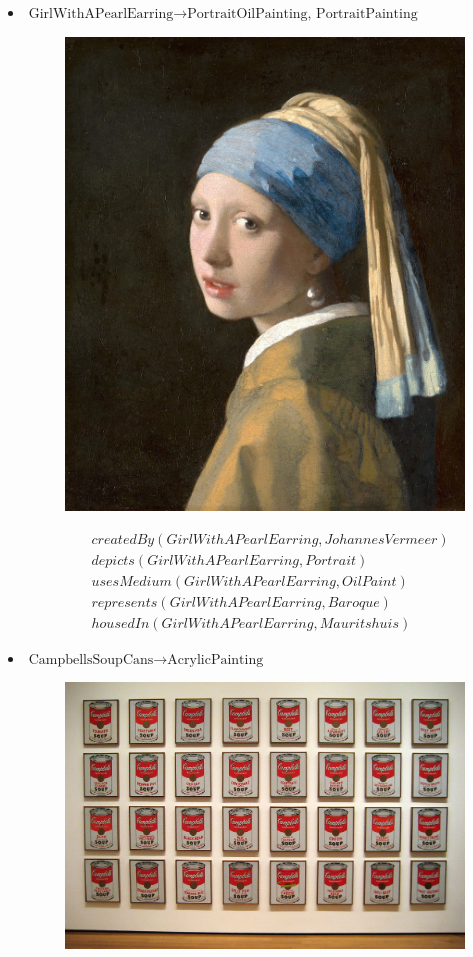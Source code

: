 \documentclass[a4paper, 11pt]{article}
\begin{document}
\begin{itemize}
  \item $\text{GirlWithAPearlEarring} \to \text{PortraitOilPainting, PortraitPainting}$
    \begin{figure}[H]
      \centering
      \includegraphics[width=0.35\linewidth]{images/girlwithpearlearring.jpg}
    \end{figure}
    \begin{align*}
      &createdBy(GirlWithAPearlEarring, JohannesVermeer)\\
      &depicts(GirlWithAPearlEarring, Portrait)\\
      &usesMedium(GirlWithAPearlEarring, OilPaint)\\
      &represents(GirlWithAPearlEarring, Baroque)\\
      &housedIn(GirlWithAPearlEarring, Mauritshuis)
    \end{align*}
  \item $\text{CampbellsSoupCans} \to \text{AcrylicPainting}$
    \begin{figure}[H]
      \centering
      \includegraphics[width=\linewidth]{images/campbellcans.jpg}
    \end{figure}
    \begin{align*}

\end{align*}
\end{itemize}
\end{document}
